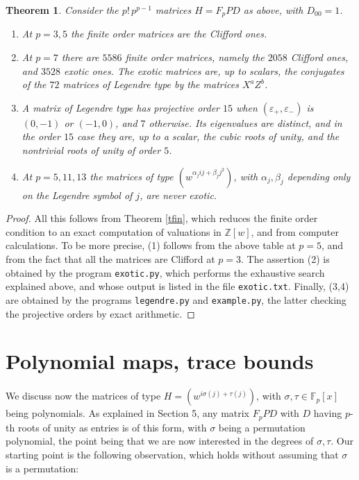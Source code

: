 \documentclass[11pt]{amsart}
\newtheorem{theorem}{Theorem}[section]
\theoremstyle{definition}
\begin{document}
\begin{theorem}\label{texo}
Consider the $p!\,p^{p-1}$ matrices $H=F_pPD$ as above, with $D_{00}=1$.
\begin{enumerate}
\item At $p=3,5$ the finite order matrices are the Clifford ones.

\item At $p=7$ there are $5586$ finite order matrices, namely the $2058$ Clifford ones, and $3528$ exotic ones. The exotic matrices are, up to scalars, the conjugates of the $72$ matrices of Legendre type by the matrices $X^aZ^b$.

\item A matrix of Legendre type has projective order $15$ when $(\varepsilon_+,\varepsilon_-)$ is $(0,-1)$ or $(-1,0)$, and $7$ otherwise. Its eigenvalues are distinct, and in the order $15$ case they are, up to a scalar, the cubic roots of unity, and the nontrivial roots of unity of order $5$.

\item At $p=5,11,13$ the matrices of type $(w^{\alpha_jij+\beta_jj^2})$, with $\alpha_j,\beta_j$ depending only on the Legendre symbol of $j$, are never exotic.
\end{enumerate}
\end{theorem}

\begin{proof}
All this follows from Theorem \ref{tfin}, which reduces the finite order condition to an exact computation of valuations in $\mathbb Z[w]$, and from computer calculations. To be more precise, (1) follows from the above table at $p=5$, and from the fact that all the matrices are Clifford at $p=3$. The assertion (2) is obtained by the program \texttt{exotic.py}, which performs the exhaustive search explained above, and whose output is listed in the file \texttt{exotic.txt}. Finally, (3,4) are obtained by the programs \texttt{legendre.py} and \texttt{example.py}, the latter checking the projective orders by exact arithmetic.
\end{proof}

\section{Polynomial maps, trace bounds}

We discuss now the matrices of type $H=(w^{i\sigma(j)+\tau(j)})$, with $\sigma,\tau\in\mathbb F_p[x]$ being polynomials. As explained in Section 5, any matrix $F_pPD$ with $D$ having $p$-th roots of unity as entries is of this form, with $\sigma$ being a permutation polynomial, the point being that we are now interested in the degrees of $\sigma,\tau$. Our starting point is the following observation, which holds without assuming that $\sigma$ is a permutation:
\end{document}
